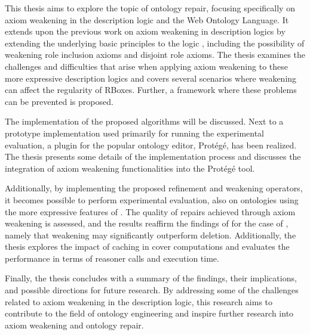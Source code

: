 This thesis aims to explore the topic of ontology repair, focusing specifically on axiom weakening in the \SROIQ description logic and the Web Ontology Language. It extends upon the previous work on axiom weakening in description logics by extending the underlying basic principles to the logic \SROIQ, including the possibility of weakening role inclusion axioms and disjoint role axioms. The thesis examines the challenges and difficulties that arise when applying axiom weakening to these more expressive description logics and covers several scenarios where weakening can affect the regularity of \SROIQ RBoxes. Further, a framework where these problems can be prevented is proposed.

The implementation of the proposed algorithms will be discussed. Next to a prototype implementation used primarily for running the experimental evaluation, a plugin for the popular ontology editor, Protégé, has been realized. The thesis presents some details of the implementation process and discusses the integration of axiom weakening functionalities into the Protégé tool.

Additionally, by implementing the proposed refinement and weakening operators, it becomes possible to perform experimental evaluation, also on ontologies using the more expressive features of \SROIQ. The quality of repairs achieved through axiom weakening is assessed, and the results reaffirm the findings of \cite{troquard2018repairing} for the case of \SROIQ, namely that weakening may significantly outperform deletion. Additionally, the thesis explores the impact of caching in cover computations and evaluates the performance in terms of reasoner calls and execution time.

Finally, the thesis concludes with a summary of the findings, their implications, and possible directions for future research. By addressing some of the challenges related to axiom weakening in the \SROIQ description logic, this research aims to contribute to the field of ontology engineering and inspire further research into axiom weakening and ontology repair.

